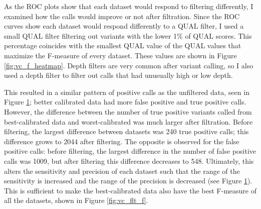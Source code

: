 As the ROC plots show that each dataset would respond to filtering differently, I examined how the calls would improve or not after filtration. Since the ROC curves show each dataset would respond differently to a QUAL filter, I used a small QUAL filter filtering out variants with the lower 1\% of QUAL scores. This percentage coincides with the smallest QUAL value of the QUAL values that maximize the F-measure of every dataset. These values are shown in Figure \ref{fig:vc_f_heatmap}. Depth filters are very common after variant calling, so I also used a depth filter to filter out calls that had unusually high or low depth.

This resulted in a similar pattern of positive calls as the unfiltered data, seen in Figure \ref{fig:vc_flt_p}; better calibrated data had more false positive and true positive calls. However, the difference between the number of true positive variants called from best-calibrated data and worst-calibrated was much larger after filtration. Before filtering, the largest difference between datasets was 240 true positive calls; this difference grows to 2044 after filtering. The opposite is observed for the false positive calls: before filtering, the largest difference in the number of false positive calls was 1009, but after filtering this difference decreases to 548. 
Ultimately, this alters the sensitivity and precision of each dataset such that the range of the sensitivity is increased and the range of the precision is decreased (see Figure \ref{fig:vc_flt_p}). This is sufficient to make the best-calibrated data also have the best F-measure of all the datasets, shown in Figure \ref{fig:vc_flt_f}.

\begin{figure}
\centering
{}
\label{fig:vc_flt_p}
\end{figure}

